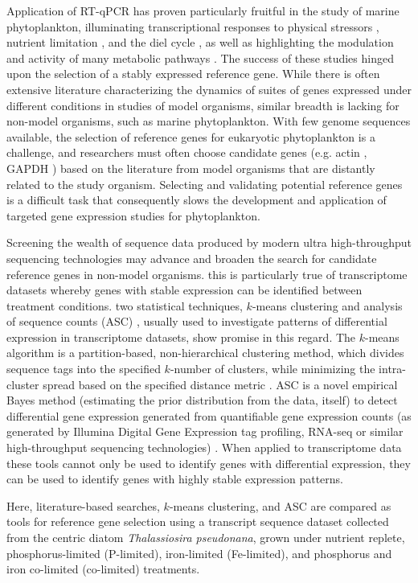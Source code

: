 	Application of RT-qPCR has proven particularly fruitful in the study of marine phytoplankton, illuminating transcriptional responses to physical stressors \citep{Rosic2010, Rosic2010}, nutrient limitation \citep{Davis2006, Moseley2006, Davis2008, Stuart2009, Whitney2011a, Wurch2011, Bender2012, Berg2008}, and the diel cycle \citep{Whitney2011a, Bender2012}, as well as highlighting the modulation and activity of many metabolic pathways \citep{Moseley2006, McGinn2008, Mock2008, Bender2012}. The success of these studies hinged upon the selection of a stably expressed reference gene. While there is often extensive literature characterizing the dynamics of suites of genes expressed under different conditions in studies of model organisms, similar breadth is lacking for non-model organisms, such as marine phytoplankton. With few genome sequences available, the selection of reference genes for eukaryotic phytoplankton is a challenge, and researchers must often choose candidate genes (e.g. actin \citep{Nicot2005}, GAPDH \citep{Czechowski2005}) based on the literature from model organisms that are distantly related to the study organism. Selecting and validating potential reference genes is a difficult task that consequently slows the development and application of targeted gene expression studies for phytoplankton. \par
	Screening the wealth of sequence data produced by modern ultra high-throughput sequencing technologies may advance and broaden the search for candidate reference genes in non-model organisms. this is particularly true of transcriptome datasets whereby genes with stable expression can be identified between treatment conditions. two statistical techniques, $k$-means clustering \citep{Hartigan1979} and analysis of sequence counts (ASC) \citep{Wu2010}, usually used to investigate patterns of differential expression in transcriptome datasets, show promise in this regard. The $k$-means algorithm is a partition-based, non-hierarchical clustering method, which divides sequence tags into the specified $k$-number of clusters, while minimizing the intra-cluster spread based on the specified distance metric \citep{Hartigan1979, Tavazoie1999, Gerstein2000, Quackenbush2001, Dhaeseleer2005}. ASC is a novel empirical Bayes method (estimating the prior distribution from the data, itself) to detect differential gene expression generated from quantifiable gene expression counts (as generated by Illumina Digital Gene Expression tag profiling, RNA-seq or similar high-throughput sequencing technologies) \citep{Wu2010}. When applied to transcriptome data these tools cannot only be used to identify genes with differential expression, they can be used to identify genes with highly stable expression patterns.\par 
	Here, literature-based searches, $k$-means clustering, and ASC are compared as tools for reference gene selection using a transcript sequence dataset collected from the centric diatom \textit{Thalassiosira pseudonana}, grown under nutrient replete, phosphorus-limited (P-limited), iron-limited (Fe-limited), and phosphorus and iron co-limited (co-limited) treatments.

